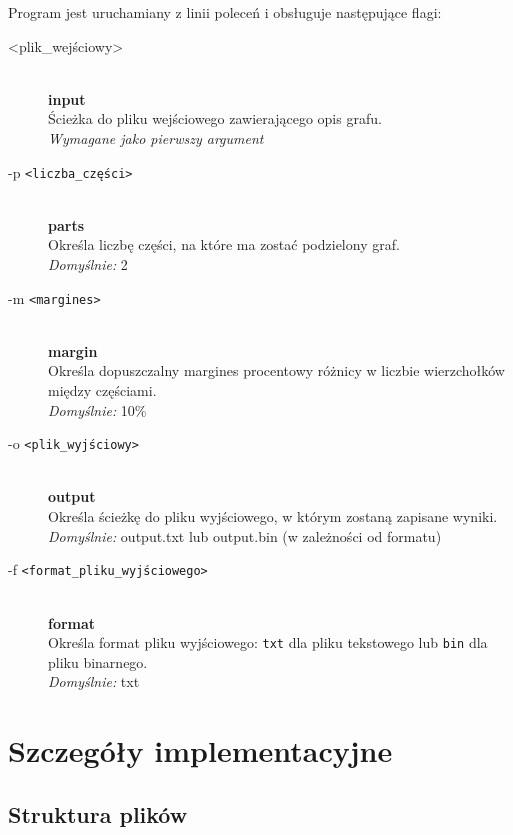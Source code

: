 \documentclass{article}
\begin{document}
Program jest uruchamiany z linii poleceń i obsługuje następujące flagi:

\begin{description}
    \item[<plik\_wejściowy>] \hfill \\
    \textbf{input} \\
    Ścieżka do pliku wejściowego zawierającego opis grafu. \\
    \textit{Wymagane jako pierwszy argument}
    
    \item[-p \texttt{<liczba\_części>}] \hfill \\
    \textbf{parts} \\
    Określa liczbę części, na które ma zostać podzielony graf. \\
    \textit{Domyślnie:} 2
    
    \item[-m \texttt{<margines>}] \hfill \\
    \textbf{margin} \\
    Określa dopuszczalny margines procentowy różnicy w liczbie wierzchołków między częściami. \\
    \textit{Domyślnie:} 10\%
    
    \item[-o \texttt{<plik\_wyjściowy>}] \hfill \\
    \textbf{output} \\
    Określa ścieżkę do pliku wyjściowego, w którym zostaną zapisane wyniki. \\
    \textit{Domyślnie:} output.txt lub output.bin (w zależności od formatu)
    
    \item[-f \texttt{<format\_pliku\_wyjściowego>}] \hfill \\
    \textbf{format} \\
    Określa format pliku wyjściowego: \texttt{txt} dla pliku tekstowego lub \texttt{bin} dla pliku binarnego. \\
    \textit{Domyślnie:} txt
\end{description}



\section{Szczegóły implementacyjne}



    \subsection{Struktura plików}
\end{document}
